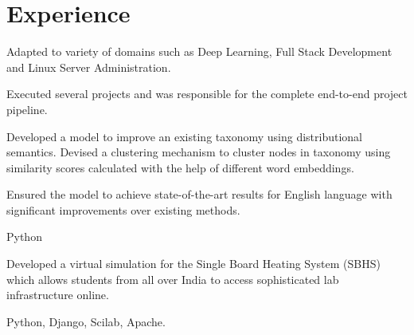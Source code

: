 
\section{Experience}

\vspace{\topsep}
\begin{tightemize}
\item Adapted to variety of domains such as Deep Learning, Full Stack Development and Linux Server Administration.
\item Executed several projects and was responsible for the complete end-to-end project pipeline.
\end{tightemize}
\sectionsep

\begin{tightemize}
\item Developed a model to improve an existing taxonomy using distributional semantics. Devised a clustering mechanism to cluster nodes in taxonomy using similarity scores calculated with the help of different word embeddings.
\item Ensured the model to achieve state-of-the-art results for English language with significant improvements over existing methods.
\item {} Python
\end{tightemize}
\sectionsep

\begin{tightemize}
\item Developed a virtual simulation for the Single Board Heating System (SBHS) which allows students from all over India to access sophisticated lab infrastructure online.
\item {} Python, Django, Scilab, Apache.
\end{tightemize}
\sectionsep
